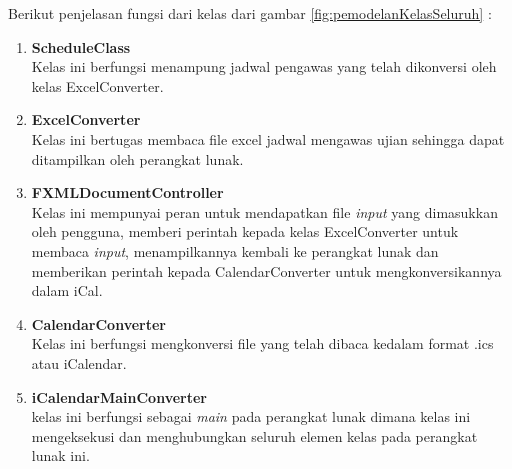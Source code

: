 Berikut penjelasan fungsi dari kelas dari gambar \ref{fig:pemodelanKelasSeluruh} :	
\begin{enumerate}
	\item \textbf{ScheduleClass}\\
	Kelas ini berfungsi menampung jadwal pengawas yang telah dikonversi oleh kelas ExcelConverter.
	\item \textbf{ExcelConverter}\\
	Kelas ini bertugas membaca file excel jadwal mengawas ujian sehingga dapat ditampilkan oleh perangkat lunak.
	\item \textbf{FXMLDocumentController}\\
	Kelas ini mempunyai peran untuk mendapatkan file \textit{input} yang dimasukkan oleh pengguna,  memberi perintah 
	kepada kelas ExcelConverter untuk membaca \textit{input}, menampilkannya kembali ke perangkat lunak dan memberikan perintah
	kepada CalendarConverter untuk mengkonversikannya dalam iCal.
	\item \textbf{CalendarConverter}\\
	Kelas ini berfungsi mengkonversi file yang telah dibaca kedalam format .ics atau iCalendar.
	\item \textbf{iCalendarMainConverter}\\
	kelas ini berfungsi sebagai \textit{main} pada perangkat lunak dimana kelas ini mengeksekusi dan menghubungkan seluruh elemen kelas 
	pada perangkat lunak ini.
\end{enumerate}
